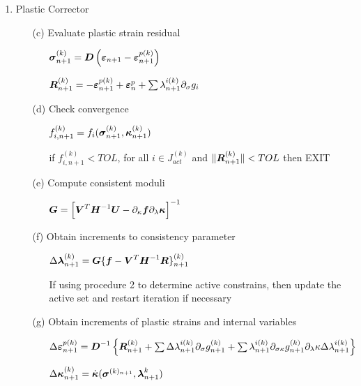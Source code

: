 \documentclass[a4paper]{article}
\newcommand{\mbf}[1]{\mbox{\boldmath$#1$}}
\newcommand{\ep}[0]{\mbf{\varepsilon}^p}
\newcommand{\e}{\mbf{\varepsilon}}
\newcommand{\sig}{\mbf{\sigma}}
\newcommand{\kap}{\mbf{\kappa}}
\begin{document}
\begin{table}
{\begin{enumerate}
\item
  Plastic Corrector
  \begin{enumerate}
  \item[(c)]
 Evaluate plastic strain residual
 \begin{itemize}
 \item[]
$\sig^{(k)}_{n+1} = \mbf{D}\left(\e_{n+1}-\e^{p(k)}_{n+1}\right)$
 \item[]
$\mbf{R}^{(k)}_{n+1}=-\e^{p(k)}_{n+1}+\ep_n+\sum\lambda^{i(k)}_{n+1}\partial_{\sigma}g_i$
 \end{itemize}
  \item[(d)]
 Check convergence
 \begin{itemize}
 \item[]
$f^{(k)}_{i,n+1}=f_i(\sig^{(k)}_{n+1},\kap^{(k)}_{n+1})$
 \item[]
if $f^{(k)}_{i,n+1} < TOL$, for all $i\in J^{(k)}_{act}$ and $\Vert\mbf{R}^{(k)}_{n+1}\Vert<TOL$ then EXIT
 \end{itemize}
  \item[(e)]
 Compute consistent moduli
 \begin{itemize}
 \item[]
$\mbf{G}=\left[\mbf{V}^T\mbf{H}^{-1}\mbf{U}-\partial_{\kappa}\mbf{f}\partial_{\lambda}\mbf{\kappa}\right]^{-1}$
 \end{itemize}
  \item[(f)]
 Obtain increments to consistency parameter
 \begin{itemize}
 \item[]
$\Delta\mbf{\lambda}^{(k)}_{n+1}=\mbf{G}\{\mbf{f}-\mbf{V}^T\mbf{H}^{-1}\mbf{R}\}^{(k)}_{n+1}$
 \item[]
If using procedure 2 to determine active constrains, then update the active set and restart iteration if necessary
 \end{itemize}
  \item[(g)]
 Obtain increments of plastic strains and internal variables
 \begin{itemize}
 \item[]
$\Delta\e^{p(k)}_{n+1}=\mbf{D}^{-1}\left\{\mbf{R}^{(k)}_{n+1}+\sum\Delta\lambda^{i(k)}_{n+1}\partial_{\sigma}g^{(k)}_{n+1}+\sum\lambda^{i(k)}_{n+1}\partial_{\sigma\kappa}g^{(k)}_{n+1}\partial_{\lambda}\kappa\Delta\lambda^{i(k)}_{n+1}\right\}$
 \item[]
$\Delta\kap^{(k)}_{n+1} = \dot{\mbf{\kappa}}(\sig^{(k)_{n+1}}, \mbf{\lambda}^{k}_{n+1})$

\end{itemize}
\end{enumerate}
\end{enumerate}}
\end{table}
\end{document}
